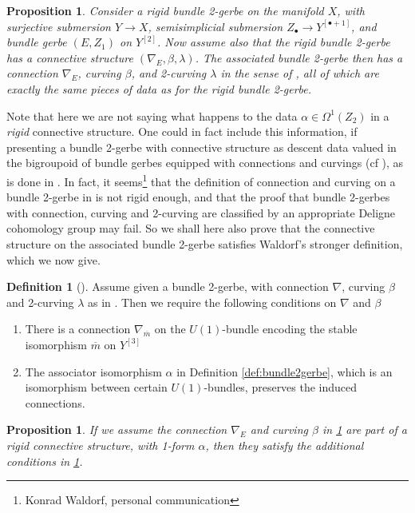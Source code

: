 \documentclass[12pt]{amsart}
\theoremstyle{plain}
\newtheorem{proposition}[theorem]{Proposition}
\theoremstyle{definition}
\newtheorem{definition}[theorem]{Definition}
\theoremstyle{remark}
\numberwithin{equation}{section}
\newcommand{\<}{\langle}
\renewcommand{\>}{\rangle}
\begin{document}
\begin{proposition}\label{prop:associated_connective_structure}
Consider a rigid bundle 2-gerbe on the manifold $X$, with surjective submersion $Y\to X$, semisimplicial submersion $Z_\bullet\to Y^{[\bullet+1]}$, and bundle gerbe $(E,Z_1)$ on $Y^{[2]}$. 
Now assume also that the rigid bundle 2-gerbe has a connective structure $(\nabla_E,\beta,\lambda)$. 
The associated bundle 2-gerbe then has a connection $\nabla_E$, curving $\beta$, and 2-curving $\lambda$ in the sense of \cite[Definition 8.1]{Ste}, all of which are exactly the same pieces of data as for the rigid bundle 2-gerbe.
\end{proposition}

Note that here we are not saying what happens to the data $\alpha\in \Omega^1(Z_2)$ in a \emph{rigid} connective structure.
One could in fact include this information, if presenting a bundle 2-gerbe with connective structure as descent data valued in the bigroupoid of bundle gerbes equipped with connections and curvings (cf \cite{Nikolaus-Schweigert_11}), as is done in \cite[Definition 4.1]{Wal}.
In fact, it seems\footnote{Konrad Waldorf, personal communication} that the definition of connection and curving on a bundle 2-gerbe in \cite{Ste} is not rigid enough, and that the proof that bundle 2-gerbes with connection, curving and 2-curving are classified by an appropriate Deligne cohomology group may fail. 
So we shall here also prove that the connective structure on the associated bundle 2-gerbe satisfies Waldorf's stronger definition, which we now give. 

\begin{definition}[\cite{Wal}]\label{def:Waldorf_connective_structure}
Assume given a bundle 2-gerbe, with connection $\nabla$, curving $\beta$ and 2-curving $\lambda$ as in \cite[Definition 8.1]{Ste}. Then we require the following conditions on $\nabla$ and $\beta$
\begin{enumerate}
\item There is a connection $\nabla_{\overline{m}}$ on the $U(1)$-bundle encoding the stable isomorphism $\overline{m}$ on $Y^{[3]}$
\item The associator isomorphism $\alpha$ in Definition \ref{def:bundle2gerbe}, which is an isomorphism between certain $U(1)$-bundles, preserves the induced connections.
\end{enumerate}
\end{definition}

\begin{proposition}\label{prop:associated_Waldorf_connective_structure}
If we assume the connection $\nabla_E$ and curving $\beta$ in \ref{prop:associated_connective_structure} are part of a \emph{rigid} connective structure, with 1-form $\alpha$, then they satisfy the additional conditions in \ref{def:Waldorf_connective_structure}.
\end{proposition}
\end{document}
